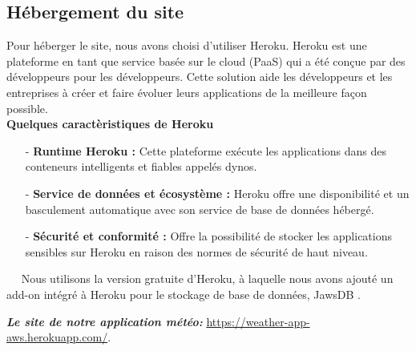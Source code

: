 \documentclass[12pt, french]{article}
\begin{document}
		\subsection{Hébergement du site}
		    Pour héberger le site, nous avons choisi d'utiliser Heroku\cite{Heroku}.
		    Heroku est une plateforme en tant que service basée sur le cloud (PaaS) qui a été conçue par des développeurs pour les développeurs.
		    Cette solution aide les développeurs et les entreprises à créer et faire évoluer leurs applications de la meilleure façon possible.\\
		    \textbf{Quelques caractèristiques de Heroku}
		     \begin{itemize} 
		     \item[-]\textbf{Runtime Heroku :}
		     Cette plateforme exécute les applications dans des conteneurs intelligents et fiables appelés dynos.
		     \item[-]\textbf{Service de données et écosystème :}
		     Heroku offre une disponibilité et un basculement automatique avec son service de base de données hébergé.
             \item[-]\textbf{Sécurité et conformité :}
             Offre la possibilité de stocker les applications sensibles sur Heroku en raison des normes de sécurité de haut niveau.
		     \end{itemize}~~
            Nous utilisons la version gratuite d'Heroku, à laquelle nous avons ajouté un add-on intégré à Heroku pour le stockage de base de données, JawsDB \cite{JawsDB}.\newline
            
        \textit{\textbf{Le site de notre application météo:}} \url{https://weather-app-aws.herokuapp.com/}. 
	
	\newpage
\end{document}
